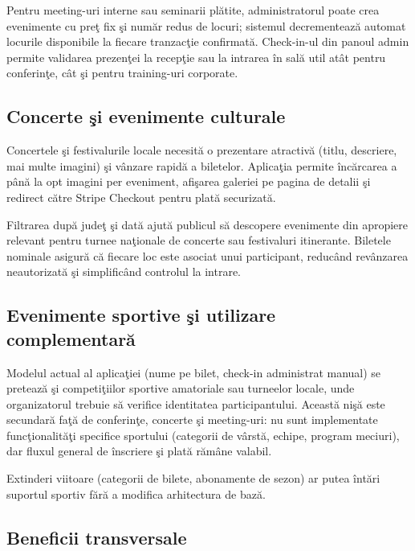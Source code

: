 Pentru meeting-uri interne sau seminarii pl\u atite, administratorul poate crea evenimente cu pre\c t fix \c si num\u ar redus de locuri; sistemul decrementeaz\u a automat locurile disponibile la fiecare tranzac\c tie confirmat\u a. Check-in-ul din panoul admin permite validarea prezen\c tei la recep\c tie sau la intrarea \^in sal\u a util at\^at pentru conferin\c te, c\^at \c si pentru training-uri corporate.

\subsection{Concerte \c si evenimente culturale}

Concertele \c si festivalurile locale necesit\u a o prezentare atractiv\u a (titlu, descriere, mai multe imagini) \c si v\^anzare rapid\u a a biletelor. Aplica\c tia permite \^inc\u arcarea a p\^an\u a la opt imagini per eveniment, afi\c sarea galeriei pe pagina de detalii \c si redirect c\u atre Stripe Checkout pentru plat\u a securizat\u a.

\newpage Filtrarea dup\u a jude\c t \c si dat\u a ajut\u a publicul s\u a descopere evenimente din apropiere relevant pentru turnee na\c tionale de concerte sau festivaluri itinerante. Biletele nominale asigur\u a c\u a fiecare loc este asociat unui participant, reduc\^and rev\^anzarea neautorizat\u a \c si simplific\^and controlul la intrare.

\subsection{Evenimente sportive \c si utilizare complementar\u a}

Modelul actual al aplica\c tiei (nume pe bilet, check-in administrat manual) se preteaz\u a \c si competi\c tiilor sportive amatoriale sau turneelor locale, unde organizatorul trebuie s\u a verifice identitatea participantului. Aceast\u a ni\c s\u a este secundar\u a fa\c t\u a de conferin\c te, concerte \c si meeting-uri: nu sunt implementate func\c tionalit\u a\c ti specifice sportului (categorii de v\^arst\u a, echipe, program meciuri), dar fluxul general de \^inscriere \c si plat\u a r\u am\^ane valabil.

Extinderi viitoare (categorii de bilete, abonamente de sezon) ar putea \^int\u ari suportul sportiv f\u ar\u a a modifica arhitectura de baz\u a.

\subsection{ Beneficii transversale}



